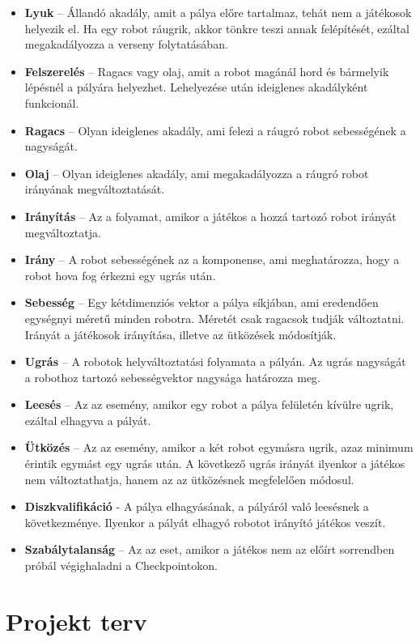 \begin{itemize}
\item \textbf{Lyuk} – Állandó akadály, amit a pálya előre tartalmaz, tehát nem a játékosok helyezik el. Ha egy robot ráugrik, akkor tönkre teszi annak felépítését, ezáltal megakadályozza a verseny folytatásában.
\item \textbf{Felszerelés} – Ragacs vagy olaj, amit a robot magánál hord és bármelyik lépésnél a pályára helyezhet. Lehelyezése után ideiglenes akadályként funkcionál.
\item \textbf{Ragacs} – Olyan ideiglenes akadály, ami felezi a ráugró robot sebességének a nagyságát.
\item \textbf{Olaj} – Olyan ideiglenes akadály, ami megakadályozza a ráugró robot irányának megváltoztatását.
\item \textbf{Irányítás} – Az a folyamat, amikor a játékos a hozzá tartozó robot irányát megváltoztatja.
\item \textbf{Irány} – A robot sebességének az a komponense, ami meghatározza, hogy a robot hova fog érkezni egy ugrás után.
\item \textbf{Sebesség} – Egy kétdimenziós vektor a pálya síkjában, ami eredendően egységnyi méretű minden robotra. Méretét csak ragacsok tudják változtatni. Irányát a játékosok irányítása, illetve az ütközések módosítják.
\item \textbf{Ugrás} – A robotok helyváltoztatási folyamata a pályán. Az ugrás nagyságát a robothoz tartozó sebességvektor nagysága határozza meg.
\item \textbf{Leesés} – Az az esemény, amikor egy robot a pálya felületén kívülre ugrik, ezáltal elhagyva a pályát.  
\item \textbf{Ütközés} – Az az esemény, amikor a két robot egymásra ugrik, azaz minimum érintik egymást egy ugrás után. A következő ugrás irányát ilyenkor a játékos nem változtathatja, hanem az az ütközésnek megfelelően módosul.
\item \textbf{Diszkvalifikáció} - A pálya elhagyásának, a pályáról való leesésnek a következménye. Ilyenkor a pályát elhagyó robotot irányító játékos veszít.
\item \textbf{Szabálytalanság} – Az az eset, amikor a játékos nem az előírt sorrendben próbál végighaladni a Checkpointokon.

\end{itemize}


\section{Projekt terv}
